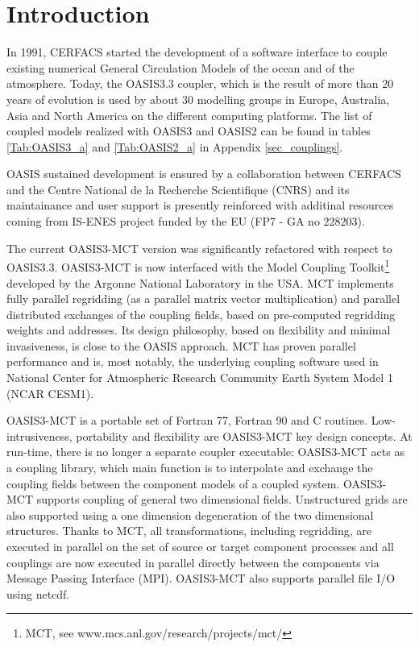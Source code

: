 \newpage
\chapter{Introduction}
\label{sec_step}

In 1991, CERFACS started the development of
a software interface to couple existing numerical General
Circulation Models of the ocean and of the atmosphere. Today, the
OASIS3.3 coupler, which is the result of more than 20 years of evolution
is used by about 30 modelling groups in Europe, Australia, Asia and
North America on the different computing platforms. The list of
coupled models realized with OASIS3  and OASIS2 can be
found in tables \ref{Tab:OASIS3_a} and \ref{Tab:OASIS2_a} in Appendix \ref{sec_couplings}.

OASIS sustained development is ensured by a collaboration
between CERFACS and the Centre National de la Recherche Scientifique
(CNRS) and its maintainance and user support is presently reinforced
with additinal resources coming from IS-ENES project funded by the EU (FP7 -
GA no 228203).

The current OASIS3-MCT version was significantly refactored with respect to OASIS3.3. OASIS3-MCT is now interfaced with the Model
Coupling Toolkit\footnote{MCT, see www.mcs.anl.gov/research/projects/mct/} \citep{mct_larson} \citep{mct_jacob} developed by the Argonne National Laboratory in the USA. MCT implements fully parallel regridding (as a parallel matrix vector 
multiplication) and parallel distributed exchanges of the coupling
fields, based on pre-computed regridding weights and addresses. 
Its design philosophy, based on flexibility and minimal invasiveness,
is close to the OASIS approach. 
MCT has proven parallel performance and is, most notably, the
underlying coupling software used in National Center for Atmospheric
Research Community Earth System Model 1 (NCAR CESM1).

OASIS3-MCT is a portable set of Fortran 77, Fortran 90 and C routines. Low-intrusiveness, portability and flexibility are OASIS3-MCT key design concepts. At run-time, there is no
longer a separate coupler executable: OASIS3-MCT acts as a coupling library, which main function is to interpolate and exchange the coupling fields between the component models of a coupled system.  OASIS3-MCT supports  coupling of general two dimensional fields.  Unstructured grids are also supported using a one dimension degeneration of the two dimensional structures. Thanks to MCT, all transformations, including regridding, are executed in parallel on the set of source or target component processes and all couplings are now executed in parallel directly between the components via Message Passing Interface
(MPI). OASIS3-MCT also supports parallel file I/O using netcdf.  

